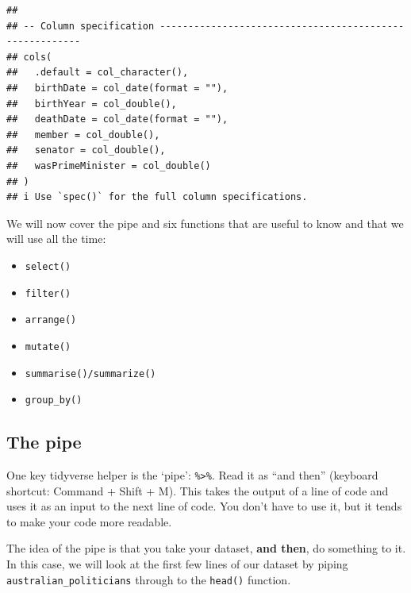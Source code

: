 \documentclass[
]{book}
\newenvironment{Shaded}{\begin{snugshade}}{\end{snugshade}}
\newcommand{\KeywordTok}[1]{\textcolor[rgb]{0.13,0.29,0.53}{\textbf{#1}}}
\newcommand{\NormalTok}[1]{#1}
\newcommand{\OperatorTok}[1]{\textcolor[rgb]{0.81,0.36,0.00}{\textbf{#1}}}
\newcommand{\StringTok}[1]{\textcolor[rgb]{0.31,0.60,0.02}{#1}}
\providecommand{\tightlist}{%
  \setlength{\itemsep}{0pt}\setlength{\parskip}{0pt}}
\begin{document}
\begin{verbatim}
## 
## -- Column specification --------------------------------------------------------
## cols(
##   .default = col_character(),
##   birthDate = col_date(format = ""),
##   birthYear = col_double(),
##   deathDate = col_date(format = ""),
##   member = col_double(),
##   senator = col_double(),
##   wasPrimeMinister = col_double()
## )
## i Use `spec()` for the full column specifications.
\end{verbatim}

We will now cover the pipe and six functions that are useful to know and that we will use all the time:

\begin{itemize}
\tightlist
\item
  \texttt{select()}
\item
  \texttt{filter()}
\item
  \texttt{arrange()}
\item
  \texttt{mutate()}
\item
  \texttt{summarise()/summarize()}
\item
  \texttt{group\_by()}
\end{itemize}

\hypertarget{the-pipe}{%
\subsection{The pipe}\label{the-pipe}}

One key tidyverse helper is the `pipe': \texttt{\%\textgreater{}\%}. Read it as ``and then'' (keyboard shortcut: Command + Shift + M). This takes the output of a line of code and uses it as an input to the next line of code. You don't have to use it, but it tends to make your code more readable.

The idea of the pipe is that you take your dataset, \textbf{and then}, do something to it. In this case, we will look at the first few lines of our dataset by piping \texttt{australian\_politicians} through to the \texttt{head()} function.

\begin{Shaded}
\end{Shaded}
\end{document}
